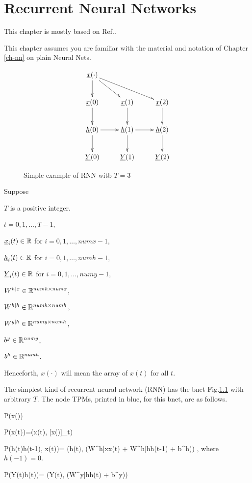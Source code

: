 \chapter{Recurrent Neural
 Networks}\label{ch-rnn}

This chapter is mostly
based on Ref.\cite{ng-rnn}.

This chapter
assumes you are
familiar 
with the material
and notation of Chapter \ref{ch-nn}
on plain Neural Nets.


\begin{figure}[h!]
\centering
$$\xymatrix{
\rvx(\cdot)\ar[d]\ar[dr]\ar[drr]\\
\rvx(0)\ar[d]&
\rvx(1)\ar[d]&
\rvx(2)\ar[d]\\
\rvh(0)\ar[d]\ar[r]&
\rvh(1)\ar[d]\ar[r]&
\rvh(2)\ar[d]\\
\rvY(0)&
\rvY(1)&
\rvY(2)
}$$
\caption{Simple example of 
RNN witb $T=3$}
\label{fig-rnn}
\end{figure}

Suppose

$T$ is a positive integer.

$t=0, 1, \ldots, T-1$,

${\underline{x}}_i(t)\in { \mathbb{R}}$ for
 $i=0,1, \ldots,numx-1$,

${\underline{h}}_i(t)\in { \mathbb{R}}$ for
 $i=0,1, \ldots,numh-1$,

${\underline{Y}}_i(t)\in { \mathbb{R}}$ for
 $i=0,1, \ldots,numy-1$,

$W^{h|x}\in{ \mathbb{R}}^{numh\times numx}$,

$W^{h|h}\in{ \mathbb{R}}^{numh\times numh}$,

$W^{y|h}\in{ \mathbb{R}}^{numy\times numh}$,

$b^y\in { \mathbb{R}}^{numy}$,

$b^h\in { \mathbb{R}}^{numh}$.

Henceforth, $x(\cdot)$ will
mean the array of $x(t)$ for all $t$.

The simplest kind of
recurrent neural network (RNN)
has
the bnet Fig.\ref{fig-rnn}
with arbitrary $T$.
The node
TPMs, printed in
blue, for this bnet, are as follows.

\beq\color{blue}
P(x(\cdot))
\eeq

\beq\color{blue}
P(x(t))=\delta(x(t), [x(\cdot)]_t)
\eeq

\beq\color{blue}
P(h(t)\cond h(t-1), x(t))=
\delta(h(t),
\cala(W^{h|x}x(t) +
 W^{h|h}h(t-1) + b^h))
\;,
\eeq
where
$h(-1)=0$.

\beq\color{blue}
P(Y(t)\cond h(t))=
\delta(Y(t),
\cala(W^{y|h}h(t) + b^y))
\eeq

